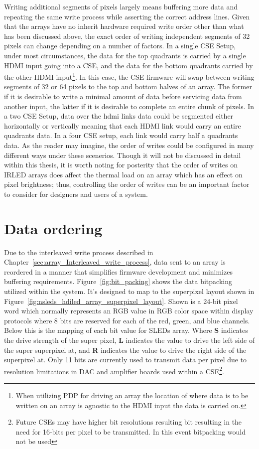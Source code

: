     Writing additional segments of pixels largely means buffering more data and repeating the same write process while asserting the correct address lines. Given that the arrays have no inherit hardware required write order other than what has been discussed above, the exact order of writing independent segments of 32 pixels can change depending on a number of factors. In a single CSE Setup, under most circumstances, the data for the top quadrants is carried by a single HDMI input going into a CSE, and the data for the bottom quadrants carried by the other HDMI input\footnote{When utilizing PDP for driving an array the location of where data is to be written on an array is agnostic to the HDMI input the data is carried on.}. In this case, the CSE firmware will swap between writing segments of 32 or 64 pixels to the top and bottom halves of an array. The former if it is desirable to write a minimal amount of data before servicing data from another input, the latter if it is desirable to complete an entire chunk of pixels. In a two CSE Setup, data over the hdmi links data could be segmented either horizontally or vertically meaning that each HDMI link would carry an entire quadrants data. In a four CSE setup, each link would carry half a quadrants data. As the reader may imagine, the order of writes could be configured in many different ways under these scenerios. Though it will not be discussed in detail within this thesis, it is worth noting for posterity that the order of writes on IRLED arrays does affect the thermal load on an array which has an effect on pixel brightness\cite{BarakhshanEtAl2017, LaVeigneSieglinger2012, norton2}; thus, controlling the order of writes can be an important factor to consider for designers and users of a system.

\section{Data ordering}
    Due to the interleaved write process described in Chapter~\ref{sec:array_Interleaved_write_process}, data sent to an array is reordered in a manner that simplifies firmware development and minimizes buffering requirements. Figure~\ref{fig:bit_packing} shows the data bitpacking utilized within the system. It's designed to map to the superpixel layout shown in Figure~\ref{fig:nsleds_hdiled_array_superpixel_layout}. Shown is a 24-bit pixel word which normally represents an RGB value in RGB color space within display protocols where 8 bits are reserved for each of the red, green, and blue channels. Below this is the mapping of each bit value for SLEDs array. Where \textbf{S} indicates the drive strength of the super pixel, \textbf{L} indicates the value to drive the left side of the super superpixel at, and \textbf{R} indicates the value to drive the right side of the superpixel at. Only 11 bits are currently used to transmit data per pixel due to resolution limitations in DAC and amplifier boards used within a CSE\footnote{Future CSEs may have higher bit resolutions resulting bit resulting in the need for 16-bits per pixel to be transmitted. In this event bitpacking would not be used}.

